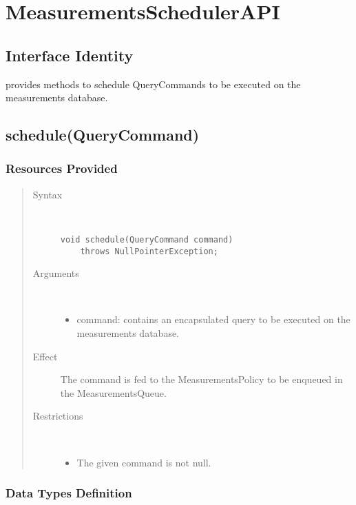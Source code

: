 \section{MeasurementsSchedulerAPI}
\label{api:measurements-scheduler-api}

\subsection{Interface Identity}

\npar {} provides methods to schedule
QueryCommands to be executed on the measurements database.

\subsection{schedule(QueryCommand)}

\subsubsection{Resources Provided}

\begin{quote}
	\begin{description}
		\item[Syntax] \ 
		\begin{verbatim}
void schedule(QueryCommand command)
    throws NullPointerException;
		\end{verbatim}
		\item[Arguments] \
		\begin{itemize}
			\item command: contains an encapsulated query to be executed on the
			measurements database.
		\end{itemize}
		\item[Effect] The command is fed to the MeasurementsPolicy to be enqueued in
		the MeasurementsQueue.
		\item[Restrictions] \ 
		\begin{itemize}
			\item The given command is not null.
		\end{itemize}
	\end{description} 
\end{quote}

\subsubsection{Data Types Definition}

